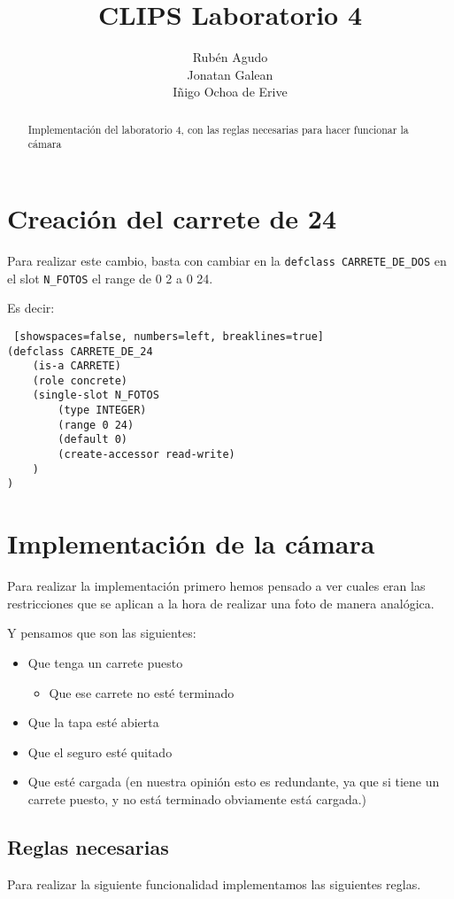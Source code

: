 \documentclass[hidelinks]{scrreprt}
\title{CLIPS Laboratorio 4}
\author{Rub\'{e}n Agudo \\
    Jonatan Galean \\
    I\~{n}igo Ochoa de Erive}
\begin{document}
\maketitle
\tableofcontents

\begin{abstract}
    Implementaci\'{o}n del laboratorio 4, con las reglas
    necesarias para hacer funcionar la c\'{a}mara
\end{abstract}

\chapter{Creaci\'{o}n del carrete de 24}
Para realizar este cambio, basta con cambiar en la \texttt{defclass CARRETE\_DE\_DOS}
en el slot \texttt{N\_FOTOS} el range de 0 2 a 0 24.

Es decir:
\begin{lstlisting} [showspaces=false, numbers=left, breaklines=true]
(defclass CARRETE_DE_24
    (is-a CARRETE)
    (role concrete)
    (single-slot N_FOTOS
        (type INTEGER)
        (range 0 24)
        (default 0)
        (create-accessor read-write)
    )
)
\end{lstlisting}

\chapter{Implementaci\'{o}n de la c\'{a}mara}
Para realizar la implementaci\'{o}n primero hemos pensado a ver cuales eran 
las restricciones que se aplican a la hora de realizar una foto de manera anal\'{o}gica.

Y pensamos que son las siguientes:
\begin{itemize}
    \item Que tenga un carrete puesto
    \begin{itemize}
        \item Que ese carrete no est\'{e} terminado
    \end{itemize}
    \item Que la tapa est\'{e} abierta
    \item Que el seguro est\'{e} quitado
    \item Que est\'{e} cargada (en nuestra opini\'{o}n esto
    es redundante, ya que si tiene un carrete puesto, y no est\'{a} terminado
    obviamente est\'{a} cargada.)
\end{itemize}

\section{Reglas necesarias}
Para realizar la siguiente funcionalidad implementamos las siguientes reglas.
\end{document}
